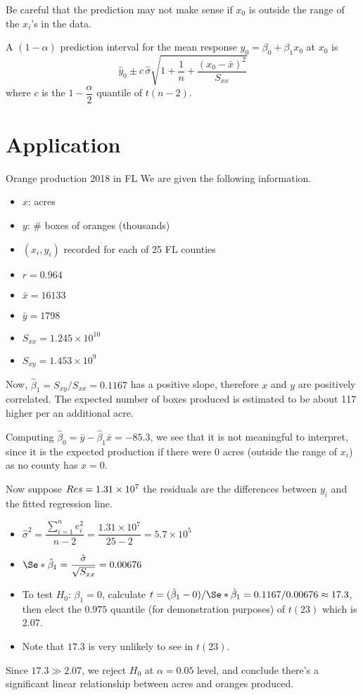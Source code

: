 \begin{Remark}{}{}
  Be careful that the prediction may not make sense if
  $ x_0 $ is outside the range of the $ x_i $'s in the data.
\end{Remark}

A $ (1-\alpha) $ prediction interval for the mean response $ y_0=\beta_0+\beta_1x_0 $
at $ x_0 $
is
\[ \hat{y}_0\pm c\, \hat{\sigma}\sqrt{1+\dfrac{1}{n}+\dfrac{(x_0-\bar{x})^2}{S_{xx}}}
\]
where $ c $ is the $ 1-\dfrac{\alpha}{2} $ quantile of $ t(n-2) $.
\section{Application}
\begin{Example}{Orange production 2018 in FL}{}
  We are given the following information.
  \begin{itemize}
    \item $ x $: acres
    \item $ y $: \# boxes of oranges (thousands)
    \item $ (x_i,y_i) $ recorded for each of 25 FL counties
    \item $ r=0.964 $
    \item $ \bar{x}=16133 $
    \item $ \bar{y}=1798 $
    \item $ S_{xx}=1.245\times 10^{10} $
    \item $ S_{xy}=1.453\times 10^9 $
  \end{itemize}
  Now,
  $ \hat{\beta}_1=S_{xy}/S_{xx}=0.1167 $
  has a positive slope, therefore $ x $ and $ y $ are
  positively correlated.
  The expected number of boxes produced is estimated to be about 117
  higher per an additional acre.

  Computing
  $ \hat{\beta}_0=\bar{y}-\hat{\beta}_1\bar{x}=-85.3 $,
  we see that it is
  not meaningful to interpret, since it
  is the expected production if there were 0 acres
  (outside the range of $ x_i $) as no county has $ x=0 $.

  Now suppose $ \relax{Res}=1.31\times 10^7 $
  the residuals are the differences between $ y_i $ and the fitted regression
  line.
  \begin{itemize}
    \item $ \hat{\sigma}^2=\dfrac{\sum_{i=1}^{n} e_i^2}{n-2}=
            \dfrac{1.31\times 10^7}{25-2}=5.7\times 10^5 $
    \item $ \Se*{\hat{\beta}_1}=\dfrac{\hat{\sigma}}{\sqrt{S_{xx}}}=0.00676 $
    \item To test $ H_0 $: $ \beta_1 =0 $,
          calculate
          $ t=(\hat{\beta}_1-0)/\Se*{\hat{\beta}_1}=0.1167/0.00676
            \approx 17.3 $,
          then elect the $ 0.975 $ quantile (for demonstration purposes) of $ t(23) $
          which is $ 2.07 $.
    \item Note that $ 17.3 $ is very unlikely to see in $ t(23) $.
  \end{itemize}
  Since $ 17.3\gg2.07 $, we reject $ H_0 $ at $ \alpha=0.05 $
  level, and conclude there's a significant linear relationship between
  acres and oranges produced.


\end{Example}
